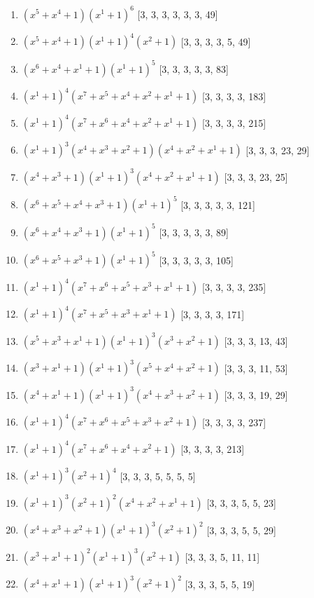 \documentclass[10pt,twocolumn]{article}
\begin{document}
\begin{enumerate}
\item $(x^{5} + x^{4} + 1)(x^{1} + 1)^{6}$  [3, 3, 3, 3, 3, 3, 49]
\item $(x^{5} + x^{4} + 1)(x^{1} + 1)^{4}(x^{2} + 1)$  [3, 3, 3, 3, 5, 49]
\item $(x^{6} + x^{4} + x^{1} + 1)(x^{1} + 1)^{5}$  [3, 3, 3, 3, 3, 83]
\item $(x^{1} + 1)^{4}(x^{7} + x^{5} + x^{4} + x^{2} + x^{1} + 1)$  [3, 3, 3, 3, 183]
\item $(x^{1} + 1)^{4}(x^{7} + x^{6} + x^{4} + x^{2} + x^{1} + 1)$  [3, 3, 3, 3, 215]
\item $(x^{1} + 1)^{3}(x^{4} + x^{3} + x^{2} + 1)(x^{4} + x^{2} + x^{1} + 1)$  [3, 3, 3, 23, 29]
\item $(x^{4} + x^{3} + 1)(x^{1} + 1)^{3}(x^{4} + x^{2} + x^{1} + 1)$  [3, 3, 3, 23, 25]
\item $(x^{6} + x^{5} + x^{4} + x^{3} + 1)(x^{1} + 1)^{5}$  [3, 3, 3, 3, 3, 121]
\item $(x^{6} + x^{4} + x^{3} + 1)(x^{1} + 1)^{5}$  [3, 3, 3, 3, 3, 89]
\item $(x^{6} + x^{5} + x^{3} + 1)(x^{1} + 1)^{5}$  [3, 3, 3, 3, 3, 105]
\item $(x^{1} + 1)^{4}(x^{7} + x^{6} + x^{5} + x^{3} + x^{1} + 1)$  [3, 3, 3, 3, 235]
\item $(x^{1} + 1)^{4}(x^{7} + x^{5} + x^{3} + x^{1} + 1)$  [3, 3, 3, 3, 171]
\item $(x^{5} + x^{3} + x^{1} + 1)(x^{1} + 1)^{3}(x^{3} + x^{2} + 1)$  [3, 3, 3, 13, 43]
\item $(x^{3} + x^{1} + 1)(x^{1} + 1)^{3}(x^{5} + x^{4} + x^{2} + 1)$  [3, 3, 3, 11, 53]
\item $(x^{4} + x^{1} + 1)(x^{1} + 1)^{3}(x^{4} + x^{3} + x^{2} + 1)$  [3, 3, 3, 19, 29]
\item $(x^{1} + 1)^{4}(x^{7} + x^{6} + x^{5} + x^{3} + x^{2} + 1)$  [3, 3, 3, 3, 237]
\item $(x^{1} + 1)^{4}(x^{7} + x^{6} + x^{4} + x^{2} + 1)$  [3, 3, 3, 3, 213]
\item $(x^{1} + 1)^{3}(x^{2} + 1)^{4}$  [3, 3, 3, 5, 5, 5, 5]
\item $(x^{1} + 1)^{3}(x^{2} + 1)^{2}(x^{4} + x^{2} + x^{1} + 1)$  [3, 3, 3, 5, 5, 23]
\item $(x^{4} + x^{3} + x^{2} + 1)(x^{1} + 1)^{3}(x^{2} + 1)^{2}$  [3, 3, 3, 5, 5, 29]
\item $(x^{3} + x^{1} + 1)^{2}(x^{1} + 1)^{3}(x^{2} + 1)$  [3, 3, 3, 5, 11, 11]
\item $(x^{4} + x^{1} + 1)(x^{1} + 1)^{3}(x^{2} + 1)^{2}$  [3, 3, 3, 5, 5, 19]

\end{enumerate}
\end{document}
